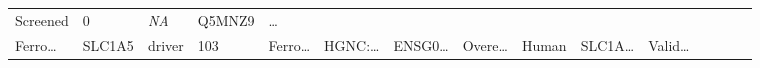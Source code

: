 \documentclass[
]{article}
\begin{document}
\begin{longtable}[]{@{}lllllllllllllll@{}}
\begin{minipage}[t]{0.05\columnwidth}
Screened\strut
\end{minipage} & \begin{minipage}[t]{0.05\columnwidth}\raggedright
0\strut
\end{minipage} & \begin{minipage}[t]{0.05\columnwidth}\raggedright
\emph{NA}\strut
\end{minipage} & \begin{minipage}[t]{0.05\columnwidth}\raggedright
Q5MNZ9\strut
\end{minipage} & \begin{minipage}[t]{0.02\columnwidth}\raggedright
\ldots{}\strut
\end{minipage}\tabularnewline
\begin{minipage}[t]{0.05\columnwidth}\raggedright
Ferro\ldots{}\strut
\end{minipage} & \begin{minipage}[t]{0.05\columnwidth}\raggedright
SLC1A5\strut
\end{minipage} & \begin{minipage}[t]{0.04\columnwidth}\raggedright
driver\strut
\end{minipage} & \begin{minipage}[t]{0.02\columnwidth}\raggedright
103\strut
\end{minipage} & \begin{minipage}[t]{0.05\columnwidth}\raggedright
Ferro\ldots{}\strut
\end{minipage} & \begin{minipage}[t]{0.05\columnwidth}\raggedright
HGNC:\ldots{}\strut
\end{minipage} & \begin{minipage}[t]{0.05\columnwidth}\raggedright
ENSG0\ldots{}\strut
\end{minipage} & \begin{minipage}[t]{0.05\columnwidth}\raggedright
Overe\ldots{}\strut
\end{minipage} & \begin{minipage}[t]{0.05\columnwidth}\raggedright
Human\strut
\end{minipage} & \begin{minipage}[t]{0.05\columnwidth}\raggedright
SLC1A\ldots{}\strut
\end{minipage} & \begin{minipage}[t]{0.05\columnwidth}\raggedright
Valid\ldots{}\strut
\end{minipage} & \begin{minipage}[t]{0.05\columnwidth}\raggedright

\end{minipage}
\end{longtable}
\end{document}
